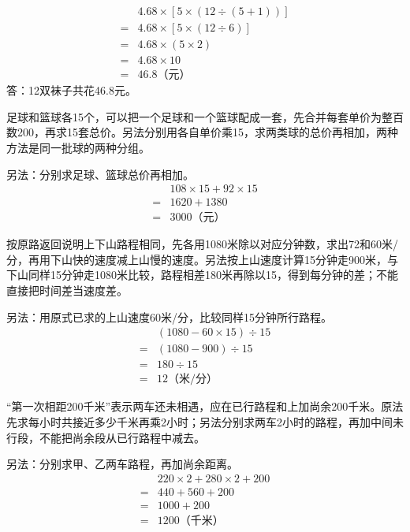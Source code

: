 \documentclass[multi=snippet,border=0pt]{standalone}
\newenvironment{snippet}[3]{\begin{minipage}{#1bp}\color{answerred}\fontsize{#2}{#3}\selectfont\raggedright}{\end{minipage}}
\begin{document}
\begin{snippet}{242}{10.5}{12.8}\[\begin{aligned}&4.68\times[5\times(12\div(5+1))]\\={}&4.68\times[5\times(12\div6)]\\={}&4.68\times(5\times2)\\={}&4.68\times10\\={}&46.8\text{（元）}\end{aligned}\]答：12双袜子共花46.8元。\end{snippet}
\begin{snippet}{505}{11.5}{14}足球和篮球各15个，可以把一个足球和一个篮球配成一套，先合并每套单价为整百数200，再求15套总价。另法分别用各自单价乘15，求两类球的总价再相加，两种方法是同一批球的两种分组。\par 另法：分别求足球、篮球总价再相加。\[\begin{aligned} &108\times15+92\times15\\={}&1620+1380\\={}&3000\text{（元）}\end{aligned}\]\end{snippet}
\begin{snippet}{505}{11.5}{14}按原路返回说明上下山路程相同，先各用1080米除以对应分钟数，求出72和60米/分，再用下山快的速度减上山慢的速度。另法按上山速度计算15分钟走900米，与下山同样15分钟走1080米比较，路程相差180米再除以15，得到每分钟的差；不能直接把时间差当速度差。\par 另法：用原式已求的上山速度60米/分，比较同样15分钟所行路程。\[\begin{aligned} &(1080-60\times15)\div15\\={}&(1080-900)\div15\\={}&180\div15\\={}&12\text{（米/分）}\end{aligned}\]\end{snippet}
\begin{snippet}{505}{11.5}{14}“第一次相距200千米”表示两车还未相遇，应在已行路程和上加尚余200千米。原法先求每小时共接近多少千米再乘2小时；另法分别求两车2小时的路程，再加中间未行段，不能把尚余段从已行路程中减去。\par 另法：分别求甲、乙两车路程，再加尚余距离。\[\begin{aligned} &220\times2+280\times2+200\\={}&440+560+200\\={}&1000+200\\={}&1200\text{（千米）}\end{aligned}\]\end{snippet}
\end{document}
